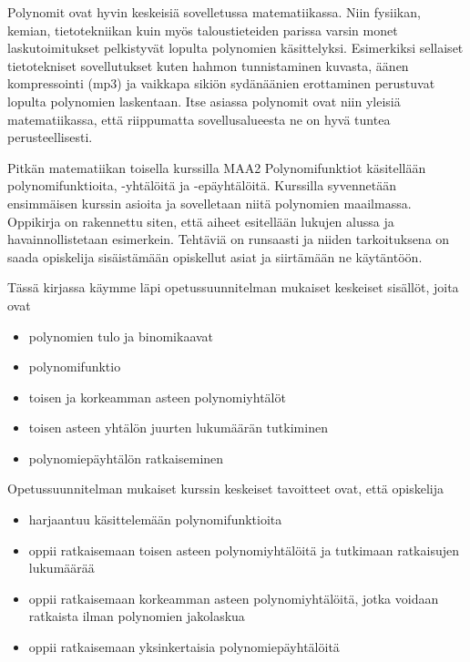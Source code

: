 Polynomit ovat hyvin keskeisiä sovelletussa matematiikassa. Niin fysiikan, kemian, tietotekniikan kuin myös taloustieteiden parissa varsin monet laskutoimitukset pelkistyvät lopulta polynomien käsittelyksi. Esimerkiksi sellaiset tietotekniset sovellutukset kuten hahmon tunnistaminen kuvasta, äänen kompressointi (mp3) ja vaikkapa sikiön sydänäänien erottaminen perustuvat lopulta polynomien laskentaan. Itse asiassa polynomit ovat niin yleisiä matematiikassa, että riippumatta sovellusalueesta ne on hyvä tuntea perusteellisesti.

Pitkän matematiikan toisella kurssilla MAA2 Polynomifunktiot käsitellään polynomifunktioita, -yhtälöitä ja -epäyhtälöitä. Kurssilla syvennetään ensimmäisen kurssin asioita ja sovelletaan niitä polynomien maailmassa. Oppikirja on rakennettu siten, että aiheet esitellään lukujen alussa ja havainnollistetaan esimerkein. Tehtäviä on runsaasti ja niiden tarkoituksena on saada opiskelija sisäistämään opiskellut asiat ja siirtämään ne käytäntöön.

Tässä kirjassa käymme läpi opetussuunnitelman mukaiset keskeiset sisällöt, joita ovat
\begin{itemize}
\item polynomien tulo ja binomikaavat
\item polynomifunktio
\item toisen ja korkeamman asteen polynomiyhtälöt
\item toisen asteen yhtälön juurten lukumäärän tutkiminen
\item polynomiepäyhtälön ratkaiseminen
\end{itemize}

Opetussuunnitelman mukaiset kurssin keskeiset tavoitteet ovat, että opiskelija
\begin{itemize}
\item harjaantuu käsittelemään polynomifunktioita
\item oppii ratkaisemaan toisen asteen polynomiyhtälöitä ja tutkimaan ratkaisujen lukumäärää
\item oppii ratkaisemaan korkeamman asteen polynomiyhtälöitä, jotka voidaan ratkaista ilman polynomien jakolaskua
\item oppii ratkaisemaan yksinkertaisia polynomiepäyhtälöitä
\end{itemize}


